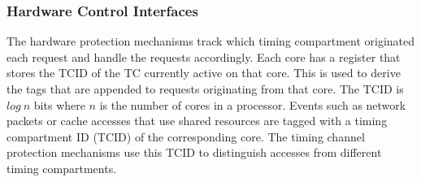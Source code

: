 


\subsubsection{Hardware Control Interfaces}



The hardware protection mechanisms track which timing compartment originated 
each request and handle the requests accordingly. Each core has a register that 
stores the TCID of the TC currently active on that core. This is used to derive 
the tags that are appended to requests originating from that core. The TCID is 
$log\ n$ bits where $n$ is the number of cores in a processor. 
Events such as network packets or cache accesses that use shared resources are 
tagged with a timing compartment ID (TCID) of the corresponding core. 
The timing channel protection mechanisms use this TCID to distinguish accesses
from different timing compartments.

